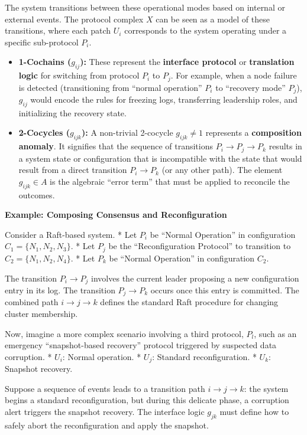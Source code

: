 \documentclass[
]{article}
\providecommand{\tightlist}{%
  \setlength{\itemsep}{0pt}\setlength{\parskip}{0pt}}
\begin{document}
The system transitions between these operational modes based on internal
or external events. The protocol complex \(X\) can be seen as a model of
these transitions, where each patch \(U_i\) corresponds to the system
operating under a specific sub-protocol \(P_i\).

\begin{itemize}
\tightlist
\item
  \textbf{1-Cochains (\(g_{ij}\)):} These represent the
  \textbf{interface protocol} or \textbf{translation logic} for
  switching from protocol \(P_i\) to \(P_j\). For example, when a node
  failure is detected (transitioning from ``normal operation'' \(P_i\)
  to ``recovery mode'' \(P_j\)), \(g_{ij}\) would encode the rules for
  freezing logs, transferring leadership roles, and initializing the
  recovery state.
\item
  \textbf{2-Cocycles (\(g_{ijk}\)):} A non-trivial 2-cocycle
  \(g_{ijk} \neq 1\) represents a \textbf{composition anomaly}. It
  signifies that the sequence of transitions \(P_i \to P_j \to P_k\)
  results in a system state or configuration that is incompatible with
  the state that would result from a direct transition \(P_i \to P_k\)
  (or any other path). The element \(g_{ijk} \in A\) is the algebraic
  ``error term'' that must be applied to reconcile the outcomes.
\end{itemize}

\textbf{Example: Composing Consensus and Reconfiguration}

Consider a Raft-based system. * Let \(P_i\) be ``Normal Operation'' in
configuration \(C_1 = \{N_1, N_2, N_3\}\). * Let \(P_j\) be the
``Reconfiguration Protocol'' to transition to
\(C_2 = \{N_1, N_2, N_4\}\). * Let \(P_k\) be ``Normal Operation'' in
configuration \(C_2\).

The transition \(P_i \to P_j\) involves the current leader proposing a
new configuration entry in its log. The transition \(P_j \to P_k\)
occurs once this entry is committed. The combined path \(i \to j \to k\)
defines the standard Raft procedure for changing cluster membership.

Now, imagine a more complex scenario involving a third protocol,
\(P_l\), such as an emergency ``snapshot-based recovery'' protocol
triggered by suspected data corruption. * \(U_i\): Normal operation. *
\(U_j\): Standard reconfiguration. * \(U_k\): Snapshot recovery.

Suppose a sequence of events leads to a transition path
\(i \to j \to k\): the system begins a standard reconfiguration, but
during this delicate phase, a corruption alert triggers the snapshot
recovery. The interface logic \(g_{jk}\) must define how to safely abort
the reconfiguration and apply the snapshot.
\end{document}
